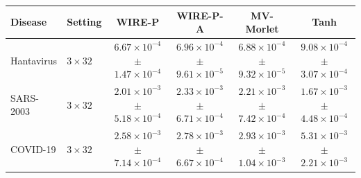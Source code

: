 \begin{tabular}{llcccc}
\toprule
Disease & Setting & WIRE-P & WIRE-P-A & MV-Morlet & Tanh \\
\midrule
Hantavirus & $3\times32$ & \textbf{$6.67\times10^{-4}$ $\pm$ $1.47\times10^{-4}$} & $6.96\times10^{-4}$ $\pm$ $9.61\times10^{-5}$ & $6.88\times10^{-4}$ $\pm$ $9.32\times10^{-5}$ & $9.08\times10^{-4}$ $\pm$ $3.07\times10^{-4}$ \\
SARS-2003 & $3\times32$ & $2.01\times10^{-3}$ $\pm$ $5.18\times10^{-4}$ & $2.33\times10^{-3}$ $\pm$ $6.71\times10^{-4}$ & $2.21\times10^{-3}$ $\pm$ $7.42\times10^{-4}$ & \textbf{$1.67\times10^{-3}$ $\pm$ $4.48\times10^{-4}$} \\
COVID-19 & $3\times32$ & \textbf{$2.58\times10^{-3}$ $\pm$ $7.14\times10^{-4}$} & $2.78\times10^{-3}$ $\pm$ $6.67\times10^{-4}$ & $2.93\times10^{-3}$ $\pm$ $1.04\times10^{-3}$ & $5.31\times10^{-3}$ $\pm$ $2.21\times10^{-3}$ \\
\bottomrule
\end{tabular}